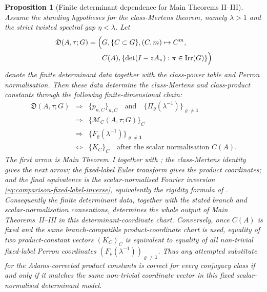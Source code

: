\documentclass[11pt,a4paper]{amsart}
\theoremstyle{plain}
\newtheorem{proposition}[theorem]{Proposition}
\theoremstyle{definition}
\theoremstyle{remark}
\DeclareMathOperator{\Irr}{Irr}
\begin{document}
\begin{proposition}[Finite determinant dependence for Main Theorems II--III]
  \label{prop:class-mertens-product-dependency-chain}
  Assume the standing hypotheses for the class-Mertens theorem, namely
  \(\lambda>1\) and the strict twisted spectral gap
  \(\eta<\lambda\).  Let
  \[
  \begin{aligned}
    \mathfrak D(A,\tau;G)=
    \Bigl(&G,\{C\subset G\},(C,m)\mapsto C^m,\\
      &C(A),\{\det(I-zA_\pi):\pi\in\Irr(G)\}\Bigr)
  \end{aligned}
  \]
  denote the finite determinant data together with the class-power table
  and Perron normalisation.  Then these data determine the class-Mertens and
  class-product constants through the following finite-dimensional chain:
  \[
  \begin{array}{ccl}
    \mathfrak D(A,\tau;G)&\Longrightarrow&
      \{p_{n,C}\}_{n,C}\quad\text{and}\quad
      \{\Pi_\varrho(\lambda^{-1})\}_{\varrho\ne\mathbf1}\\[0.4ex]
    &\Longrightarrow&
      \{\mathcal M_C(A,\tau;G)\}_C\\[0.4ex]
    &\Longrightarrow&
      \{F_\varrho(\lambda^{-1})\}_{\varrho\ne\mathbf1}\\[0.4ex]
    &\Longleftrightarrow&
      \{K_C\}_C\quad\text{after the scalar normalisation }C(A).
  \end{array}
  \]
  The first arrow is Main Theorem~I together with
  ; the class-Mertens identity gives the next
  arrow; the fixed-label Euler transform gives the product coordinates; and the
  final equivalence is the scalar-normalised Fourier inversion
  \eqref{eq:comparison-fixed-label-inverse}, equivalently the rigidity formula
  of .
  Consequently the finite determinant data, together with the stated
  branch and scalar-normalisation conventions, determines the whole output of
  Main Theorems~II--III in this determinant-coordinate chart.  Conversely,
  once \(C(A)\) is fixed and the same branch-compatible product-coordinate
  chart is used, equality of two product-constant vectors \((K_C)_C\) is
  equivalent to equality of all non-trivial fixed-label Perron coordinates
  \((F_\varrho(\lambda^{-1}))_{\varrho\ne\mathbf1}\).  Thus any attempted
  substitute for the Adams-corrected product constants is correct for every
  conjugacy class if and only if it matches the same non-trivial coordinate
  vector in this fixed scalar-normalised determinant model.


\end{proposition}
\end{document}
